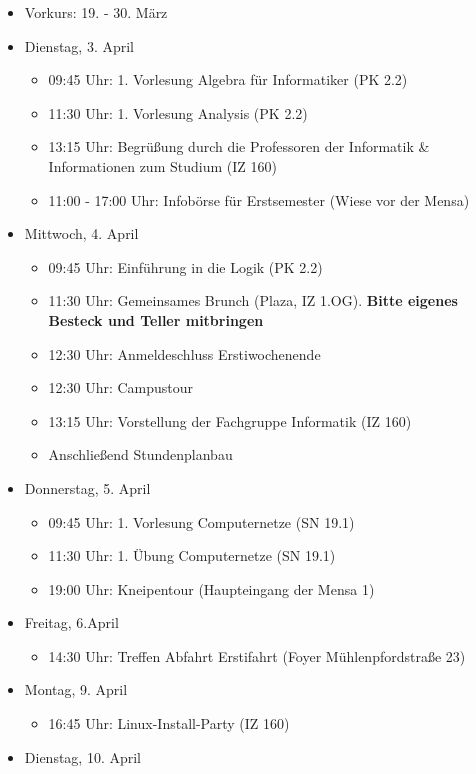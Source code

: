\begin{itemize}
	\item Vorkurs: 19. - 30. März
	\item Dienstag, 3. April
	\begin{itemize}
		\item 09:45 Uhr: 1. Vorlesung Algebra für Informatiker (PK 2.2)
		\item 11:30 Uhr: 1. Vorlesung Analysis (PK 2.2)
		\item 13:15 Uhr: Begrüßung durch die Professoren der Informatik \& Informationen zum Studium (IZ 160)
		\item 11:00 - 17:00 Uhr: Infobörse für Erstsemester (Wiese vor der Mensa)
	\end{itemize}
	\item Mittwoch, 4. April
	\begin{itemize}
		\item 09:45 Uhr: Einführung in die Logik (PK 2.2)
		\item 11:30 Uhr: Gemeinsames Brunch (Plaza, IZ 1.OG). \textbf{Bitte eigenes Besteck und Teller mitbringen}
		\item 12:30 Uhr: Anmeldeschluss Erstiwochenende
		\item 12:30 Uhr: Campustour
		\item 13:15 Uhr: Vorstellung der Fachgruppe Informatik (IZ 160)
		\item Anschließend Stundenplanbau
	\end{itemize}
	\newpage
	\item Donnerstag, 5. April
	\begin{itemize}
		\item 09:45 Uhr: 1. Vorlesung Computernetze (SN 19.1)
		\item 11:30 Uhr: 1. Übung Computernetze (SN 19.1)
		\item 19:00 Uhr: Kneipentour (Haupteingang der Mensa 1)
	\end{itemize}
	\item Freitag, 6.April
	\begin{itemize}
		\item 14:30 Uhr: Treffen Abfahrt Erstifahrt (Foyer Mühlenpfordstraße 23)
	\end{itemize}
	\item Montag, 9. April
	\begin{itemize}
		\item 16:45 Uhr: Linux-Install-Party (IZ 160)
	\end{itemize}
	\item Dienstag, 10. April

\end{itemize}
